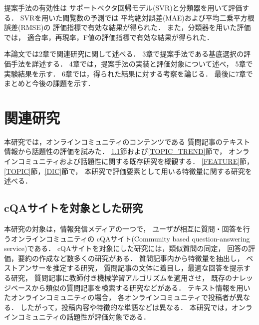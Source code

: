 \documentclass[12pt,a4paper,twocolumn,twoside]{jsik}
\begin{document}
\newpage
提案手法の有効性は
サポートベクタ回帰モデル(SVR)と分類器を用いて評価する．
SVRを用いた閲覧数の予測では
平均絶対誤差(MAE)および平均二乗平方根誤差(RMSE)の
評価指標で有効な結果が得られた．
また，分類器を用いた評価では，
適合率，再現率，F値の評価指標で有効な結果が得られた．

本論文では2章で関連研究に関して述べる．
3章で提案手法である基底選択の評価手法を詳述する．
4章では，提案手法の実装と評価対象について述べ，
5章で実験結果を示す．
6章では，得られた結果に対する考察を論じる．
最後に7章でまとめと今後の課題を示す．

\section{関連研究}
本研究では，オンラインコミュニティのコンテンツである
質問記事のテキスト情報から話題性の評価を試みた．
\ref{COMMUNITY}節および\ref{TOPIC_TREND}節で，
オンラインコミュニティおよび話題性に関する既存研究を概観する．
%
\ref{FEATURE}節，\ref{TOPIC}節，\ref{DIC}節で，
本研究で評価要素として用いる特徴量に関する研究を述べる．

\subsection{cQAサイトを対象とした研究}\label{COMMUNITY}
本研究の対象は，情報発信メディアの一つで，
ユーザが相互に質問・回答を行うオンラインコミュニティの
cQAサイト(Community based question-answering service)である．
%
cQAサイトを対象にした研究には，類似質問の同定，
回答の評価，要約の作成など数多くの研究がある\cite{article_okumura}．
%
質問記事内から特徴量を抽出し，
ベストアンサーを推定する研究\cite{article_yokoyama}，
質問記事の文体に着目し，最適な回答を提示する研究\cite{article_kure}，
質問記事に教師付き機械学習アルゴリズムを適用させ，
既存のナレッジベースから類似の質問記事を検索する研究\cite{article_han}などがある．
%
テキスト情報を用いたオンラインコミュニティの場合，
各オンラインコミュニティで投稿者が異なる．
したがって，投稿内容や特徴的な単語などは異なる．
本研究では，オンラインコミュニティの話題性が評価対象である．

\end{document}
